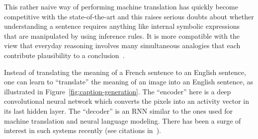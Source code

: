 \documentclass[10pts]{article}
\begin{document}
This rather naive way of performing machine translation has quickly become
competitive with the state-of-the-art and this raises serious doubts about
whether understanding a sentence requires anything like internal symbolic
expressions that are manipulated by using inference rules.
It is more compatible with
the view that everyday reasoning involves many simultaneous analogies that
each contribute plausibility to a 
conclusion~\citep{Lakoff+Johnson-2008,Rogers+McClelland-book2004}.

Instead of translating the meaning of a French sentence to an English sentence,
one can learn to ``translate'' the meaning of an image into an English sentence,
as illustrated in Figure~\ref{fig:caption-generation}. The ``encoder'' here is
a deep convolutional neural network which converts the pixels into an
activity vector in its last hidden layer. The ``decoder''
is an RNN similar to the ones used for machine translation
and neural language modeling. There has been a surge of interest in such
systems recently (see citations in~\citet{Xu-et-al-arxiv2015}).
\end{document}
